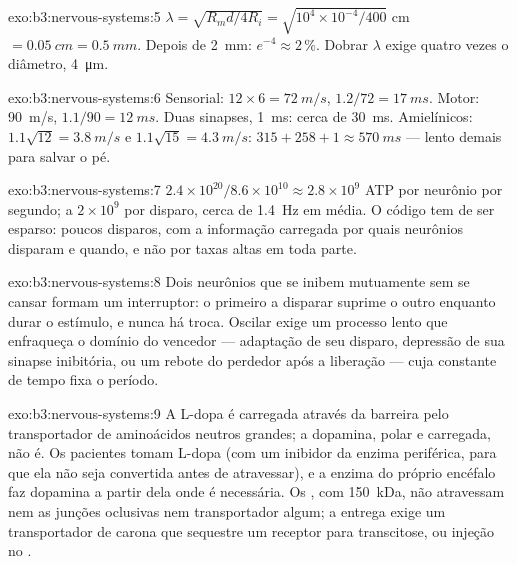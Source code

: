 \begin{solution}{exo:b3:nervous-systems:5}
$\lambda = \sqrt{R_{m}d/4R_{i}} = \sqrt{10^{4}\times 10^{-4}/400}$ cm
$= \qty{0.05}{cm} = \qty{0.5}{mm}$. Depois de \qty{2}{mm}: $e^{-4} \approx
2\,\%$. Dobrar $\lambda$ exige quatro vezes o diâmetro,
\qty{4}{\micro m}.
\end{solution}

\begin{solution}{exo:b3:nervous-systems:6}
Sensorial: $12\times 6 = \qty{72}{m/s}$, $1.2/72 = \qty{17}{ms}$. Motor:
\qty{90}{m/s}, $1.1/90 = \qty{12}{ms}$. Duas sinapses, \qty{1}{ms}:
cerca de \qty{30}{ms}. Amielínicos: $1.1\sqrt{12} = \qty{3.8}{m/s}$ e
$1.1\sqrt{15} = \qty{4.3}{m/s}$: $315 + 258 + 1 \approx \qty{570}{ms}$
--- lento demais para salvar o pé.
\end{solution}

\begin{solution}{exo:b3:nervous-systems:7}
$2.4\times 10^{20}/8.6\times 10^{10} \approx 2.8\times 10^{9}$ ATP por
neurônio por segundo; a $2\times 10^{9}$ por disparo, cerca de
\qty{1.4}{Hz} em média. O código tem de ser esparso: poucos disparos,
com a informação carregada por quais neurônios disparam e quando, e não
por taxas altas em toda parte.
\end{solution}

\begin{solution}{exo:b3:nervous-systems:8}
Dois neurônios que se inibem mutuamente sem se cansar formam um
interruptor: o primeiro a disparar suprime o outro enquanto durar o
estímulo, e nunca há troca. Oscilar exige um processo lento que
enfraqueça o domínio do vencedor --- adaptação de seu disparo, depressão
de sua sinapse inibitória, ou um rebote do perdedor após a liberação ---
cuja constante de tempo fixa o período.
\end{solution}

\begin{solution}{exo:b3:nervous-systems:9}
A L-dopa é carregada através da barreira pelo transportador de
aminoácidos neutros grandes; a dopamina, polar e carregada, não é. Os
pacientes tomam L-dopa (com um inibidor da enzima periférica, para que
ela não seja convertida antes de atravessar), e a enzima do próprio
encéfalo faz dopamina a partir dela onde é necessária. Os ,
com \qty{150}{kDa}, não atravessam nem as junções oclusivas nem
transportador algum; a entrega exige um transportador de carona que
sequestre um receptor para transcitose, ou injeção no .
\end{solution}

